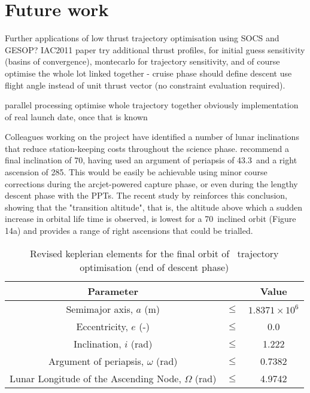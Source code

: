 \section{Future work} \label{sec:Future-work}
Further applications of low thrust trajectory optimisation using SOCS and GESOP? IAC2011 paper
try additional thrust profiles, for initial guess sensitivity (basins of convergence), montecarlo for trajectory sensitivity, and of course optimise the whole lot linked together - cruise phase should define descent
use flight angle instead of unit thrust vector (no constraint evaluation required).

parallel processing
optimise whole trajectory together
obviously implementation of real launch date, once that is known

Colleagues working on the project have identified a number of lunar inclinations that reduce station-keeping costs throughout the science phase. \textcite{Zeile2010} recommend a final inclination of 70\degrees, having used an argument of periapsis of 43.3\degrees\ and a right ascension of 285\degrees. This would be easily be achievable using minor course corrections during the arcjet-powered capture phase, or even during the lengthy descent phase with the PPTs. The recent study by \textcite{Gupta2011} reinforces this conclusion, showing that the "transition altitude", that is, the altitude above which a sudden increase in orbital life time is observed, is lowest for a 70\degrees\ inclined orbit (Figure 14a) and provides a range of right ascensions that could be trialled.

\begin{table}[h]
\caption{Revised keplerian elements for the final orbit of \BW\ trajectory optimisation (end of descent phase)}
\label{tab:Phase-5-constraints-revised}
\begin{center}
\begin{tabular} {ccc}\toprule
Parameter && Value\\\midrule
Semimajor axis, $a$ (m) &$\le$& $1.8371\times 10^6$\\
Eccentricity, $e$ (-) &$\le$& 0.0\\
Inclination, $i$ (rad) &$\le$& 1.222\\
Argument of periapsis, $\omega$ (rad) &$\le$& 0.7382 \\
Lunar Longitude of the Ascending Node, $\Omega$ (rad) &$\le$& 4.9742 \\\bottomrule
\end{tabular}
\end{center}
\end{table}



